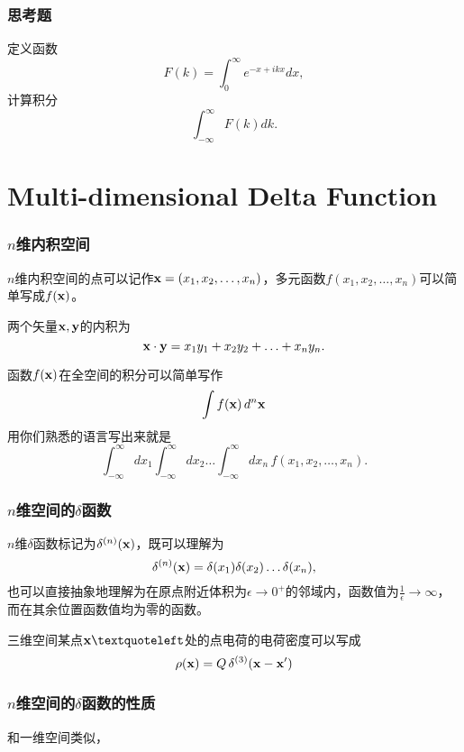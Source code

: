 \documentclass[CJK]{beamer}
\begin{document}
\begin{frame}
  \frametitle{思考题}
  定义函数
  $$ F(k) = \int_0^\infty e^{-x+ikx} dx, $$
  计算积分
  $$ \int_{-\infty}^\infty F(k) dk. $$
\end{frame}


\section{Multi-dimensional Delta Function}


\begin{frame}
  \frametitle{$n$维内积空间}
  
  $n$维内积空间的点可以记作${\mathbf{x}} = (x_1, x_2, \ldots, x_n)$，多元函数$f(x_1, x_2, \ldots, x_n)$可以简单写成$f({\mathbf{x}})$。

  \skipline
  
  两个矢量${\mathbf{x}}, {\mathbf{y}}$的内积为
 {\blue $$ {\mathbf{x}}\cdot{\mathbf{y}} = x_1y_1+x_2y_2+\ldots + x_n y_n .$$}

  \skipline

  函数$f({\mathbf{x}})$在全空间的积分可以简单写作
 {\blue $$\int f({\mathbf{x}})\, d^n{\mathbf{x}} $$}
  用你们熟悉的语言写出来就是
  $$\int_{-\infty}^\infty d x_1 \int_{-\infty}^\infty dx_2 \ldots \int_{-\infty}^\infty d x_n\, f(x_1, x_2, \ldots, x_n). $$


  \end{frame}

\begin{frame}
  \frametitle{$n$维空间的$\delta$函数}
  
  $n$维$\delta$函数标记为{\blue $\delta^{(n)}({\mathbf{x}})$}，既可以理解为
      {\blue
        $$\delta^{(n)}({\mathbf{x}}) = \delta(x_1)\delta(x_2)\ldots\delta(x_n), $$
      }
      也可以直接抽象地理解为{\blue 在原点附近体积为$\epsilon \rightarrow 0^+$的邻域内，函数值为$\frac{1}{\epsilon}\rightarrow \infty $，而在其余位置函数值均为零的函数。}

      \skiplines
      
\bex
三维空间某点$\vecx‘$处的点电荷的电荷密度可以写成
$$\rho({\mathbf{x}}) = Q\, \delta^{(3)}({\mathbf{x}} - {\mathbf{x}}')$$
\eex

\end{frame}

\begin{frame}
  \frametitle{$n$维空间的$\delta$函数的性质}
  
  和一维空间类似，

\end{frame}
\end{document}
